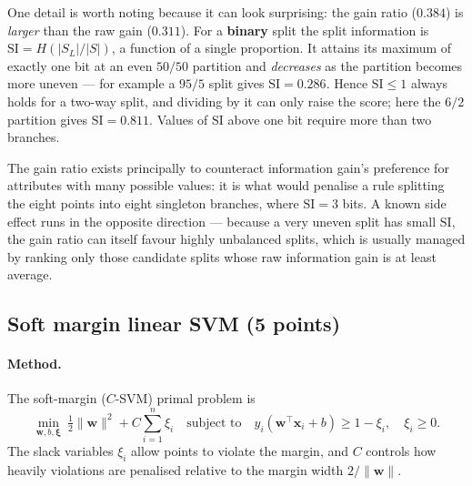 \documentclass[11pt,a4paper]{article}
\begin{document}
One detail is worth noting because it can look surprising: the gain ratio ($0.384$) is
\emph{larger} than the raw gain ($0.311$). For a \textbf{binary} split the split
information is $\mathrm{SI} = H\!\left(|S_L|/|S|\right)$, a function of a single
proportion. It attains its maximum of exactly one bit at an even $50/50$ partition and
\emph{decreases} as the partition becomes more uneven --- for example a $95/5$ split gives
$\mathrm{SI} = 0.286$. Hence $\mathrm{SI} \le 1$ always holds for a two-way split, and
dividing by it can only raise the score; here the $6/2$ partition gives
$\mathrm{SI} = 0.811$. Values of $\mathrm{SI}$ above one bit require more than two branches.

The gain ratio exists principally to counteract information gain's preference for
attributes with many possible values: it is what would penalise a rule splitting the eight
points into eight singleton branches, where $\mathrm{SI} = 3$ bits. A known side effect
runs in the opposite direction --- because a very uneven split has small $\mathrm{SI}$, the
gain ratio can itself favour highly unbalanced splits, which is usually managed by ranking
only those candidate splits whose raw information gain is at least average.

\subsection{Soft margin linear SVM (5 points)}

\paragraph{Method.} The soft-margin ($C$-SVM) primal problem is
\begin{equation}
\min_{\mathbf{w},b,\boldsymbol{\xi}}\ \tfrac12\|\mathbf{w}\|^2 + C\sum_{i=1}^{n}\xi_i
\quad\text{subject to}\quad
y_i(\mathbf{w}^{\top}\mathbf{x}_i + b) \ge 1 - \xi_i,
\quad \xi_i \ge 0 .
\label{eq:svm}
\end{equation}
The slack variables $\xi_i$ allow points to violate the margin, and $C$ controls how
heavily violations are penalised relative to the margin width $2/\|\mathbf{w}\|$.
\end{document}
